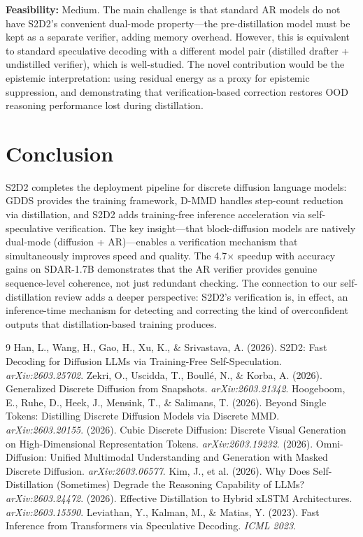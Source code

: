 \documentclass[11pt]{article}
\begin{document}
\textbf{Feasibility:} Medium. The main challenge is that standard AR models do not have S2D2's convenient dual-mode property---the pre-distillation model must be kept as a separate verifier, adding memory overhead. However, this is equivalent to standard speculative decoding with a different model pair (distilled drafter + undistilled verifier), which is well-studied. The novel contribution would be the epistemic interpretation: using residual energy as a proxy for epistemic suppression, and demonstrating that verification-based correction restores OOD reasoning performance lost during distillation.

\section{Conclusion}

S2D2 completes the deployment pipeline for discrete diffusion language models: GDDS provides the training framework, D-MMD handles step-count reduction via distillation, and S2D2 adds training-free inference acceleration via self-speculative verification. The key insight---that block-diffusion models are natively dual-mode (diffusion + AR)---enables a verification mechanism that simultaneously improves speed and quality. The 4.7$\times$ speedup with accuracy gains on SDAR-1.7B demonstrates that the AR verifier provides genuine sequence-level coherence, not just redundant checking. The connection to our self-distillation review adds a deeper perspective: S2D2's verification is, in effect, an inference-time mechanism for detecting and correcting the kind of overconfident outputs that distillation-based training produces.

\begin{thebibliography}{9}
 Han, L., Wang, H., Gao, H., Xu, K., \& Srivastava, A. (2026). S2D2: Fast Decoding for Diffusion LLMs via Training-Free Self-Speculation. \textit{arXiv:2603.25702}.
 Zekri, O., Uscidda, T., Boull\'{e}, N., \& Korba, A. (2026). Generalized Discrete Diffusion from Snapshots. \textit{arXiv:2603.21342}.
 Hoogeboom, E., Ruhe, D., Heek, J., Mensink, T., \& Salimans, T. (2026). Beyond Single Tokens: Distilling Discrete Diffusion Models via Discrete MMD. \textit{arXiv:2603.20155}.
 (2026). Cubic Discrete Diffusion: Discrete Visual Generation on High-Dimensional Representation Tokens. \textit{arXiv:2603.19232}.
 (2026). Omni-Diffusion: Unified Multimodal Understanding and Generation with Masked Discrete Diffusion. \textit{arXiv:2603.06577}.
 Kim, J., et al. (2026). Why Does Self-Distillation (Sometimes) Degrade the Reasoning Capability of LLMs? \textit{arXiv:2603.24472}.
 (2026). Effective Distillation to Hybrid xLSTM Architectures. \textit{arXiv:2603.15590}.
 Leviathan, Y., Kalman, M., \& Matias, Y. (2023). Fast Inference from Transformers via Speculative Decoding. \textit{ICML 2023}.
\end{thebibliography}
\end{document}
